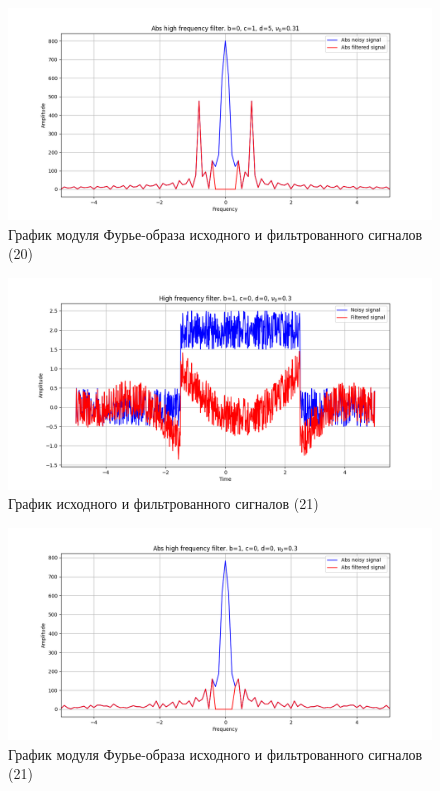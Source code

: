 \documentclass[a4paper, 12pt]{article}
\begin{document}
    \begin{figure}[!htb]
        \centering
        \includegraphics[scale=0.48]{20_abs_u_U_nolow.png}
        \captionsetup{skip=0pt}
        \caption{График модуля Фурье-образа исходного и фильтрованного сигналов (20)}
        \label{fig:fig66}
    \end{figure}
    \begin{figure}[!htb]
        \centering
        \includegraphics[scale=0.48]{21_u_flt_u_nolow.png}
        \captionsetup{skip=0pt}
        \caption{График исходного и фильтрованного сигналов (21)}
        \label{fig:fig67}
    \end{figure}
    \newpage
    \begin{figure}[!htb]
        \centering
        \includegraphics[scale=0.48]{21_abs_u_U_nolow.png}
        \captionsetup{skip=0pt}
        \caption{График модуля Фурье-образа исходного и фильтрованного сигналов (21)}
        \label{fig:fig68}
    \end{figure}
\end{document}
